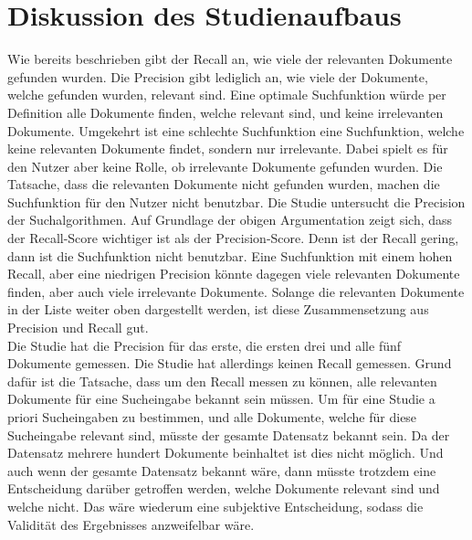 \section{Diskussion des Studienaufbaus}
Wie bereits beschrieben gibt der Recall an, wie viele der relevanten Dokumente gefunden wurden.
Die Precision gibt lediglich an, wie viele der Dokumente, welche gefunden wurden, relevant sind.
Eine optimale Suchfunktion würde per Definition alle Dokumente finden, welche relevant sind, und keine irrelevanten Dokumente.
Umgekehrt ist eine schlechte Suchfunktion eine Suchfunktion, welche keine relevanten Dokumente findet, sondern nur irrelevante.
Dabei spielt es für den Nutzer aber keine Rolle, ob irrelevante Dokumente gefunden wurden.
Die Tatsache, dass die relevanten Dokumente nicht gefunden wurden, machen die Suchfunktion für den Nutzer nicht benutzbar. 
Die Studie untersucht die Precision der Suchalgorithmen.
Auf Grundlage der obigen Argumentation zeigt sich, dass der Recall-Score wichtiger ist als der Precision-Score.
Denn ist der Recall gering, dann ist die Suchfunktion nicht benutzbar.
Eine Suchfunktion mit einem hohen Recall, aber eine niedrigen Precision könnte dagegen viele relevanten Dokumente finden, aber auch viele irrelevante Dokumente.
Solange die relevanten Dokumente in der Liste weiter oben dargestellt werden, ist diese Zusammensetzung aus Precision und Recall gut.\\

Die Studie hat die Precision für das erste, die ersten drei und alle fünf Dokumente gemessen.
Die Studie hat allerdings keinen Recall gemessen.
Grund dafür ist die Tatsache, dass um den Recall messen zu können, alle relevanten Dokumente für eine Sucheingabe bekannt sein müssen.
Um für eine Studie a priori Sucheingaben zu bestimmen, und alle Dokumente, welche für diese Sucheingabe relevant sind, müsste der gesamte Datensatz bekannt sein.
Da der Datensatz mehrere hundert Dokumente beinhaltet ist dies nicht möglich.
Und auch wenn der gesamte Datensatz bekannt wäre, dann müsste trotzdem eine Entscheidung darüber getroffen werden, welche Dokumente relevant sind und welche nicht.
Das wäre wiederum eine subjektive Entscheidung, sodass die Validität des Ergebnisses anzweifelbar wäre.